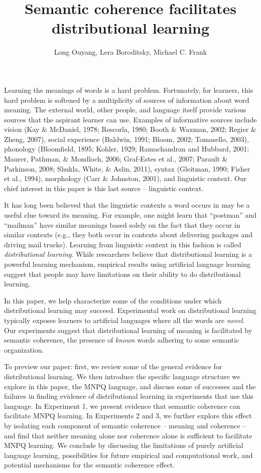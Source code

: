 \documentclass[man,floatsintext]{apa6}
\title{Semantic coherence facilitates distributional learning}
\author{Long Ouyang, Lera Boroditsky, Michael C. Frank}
\affiliation{Stanford University}
\begin{document}
\maketitle

Learning the meanings of words is a hard problem. Fortunately, for
learners, this hard problem is softened by a multiplicity of sources
of information about word meaning. The external world, other people,
and language itself provide various sources that the aspirant learner
can use. Examples of informative sources include vision (Kay \&
McDaniel, 1978; Rescorla, 1980; Booth \& Waxman, 2002; Regier \&
Zheng, 2007), social experience (Baldwin, 1991; Bloom, 2002;
Tomasello, 2003), phonology (Bloomfield, 1895; Kohler, 1929;
Ramachandran and Hubbard, 2001; Maurer, Pathman, \& Mondloch, 2006;
Graf-Estes et al., 2007; Parault \& Parkinson, 2008; Shukla, White, \&
Aslin, 2011), syntax (Gleitman, 1990; Fisher et al., 1994), morphology
(Carr \& Johnston, 2001), and linguistic context. Our chief interest
in this paper is this last source -- linguistic context.

It has long been believed that the linguistic contexts a word occurs
in may be a useful clue toward its meaning. For example, one might
learn that ``postman'' and ``mailman'' have similar meanings based
solely on the fact that they occur in similar contexts (e.g., they
both occur in contexts about delivering packages and driving mail
trucks). Learning from linguistic context in this fashion is called
\emph{distributional learning}. While researchers believe that
distributional learning is a powerful learning mechanism, empirical
results using artificial language learning suggest that people may
have limitations on their ability to do distributional learning.
 
In this paper, we help characterize some of the conditions under which
distributional learning may succeed. Experimental work on
distributional learning typically exposes learners to artificial
languages where all the words are \emph{novel}. Our experiments
suggest that distributional learning of meaning is facilitated by
semantic coherence, the presence of \emph{known} words adhering to
some semantic organization.

To preview our paper: first, we review some of the general evidence
for distributional learning. We then introduce the specific language
structure we explore in this paper, the MNPQ language, and discuss
some of successes and the failures in finding evidence of
distributional learning in experiments that use this language. In
Experiment 1, we present evidence that semantic coherence can
facilitate MNPQ learning. In Experiments 2 and 3, we further explore
this effect by isolating each component of semantic coherence --
meaning and coherence -- and find that neither meaning alone nor
coherence alone is sufficient to facilitate MNPQ learning. We conclude
by discussing the limitations of purely artificial language learning,
possibilities for future empirical and computational work, and
potential mechanisms for the semantic coherence effect.
\end{document}
